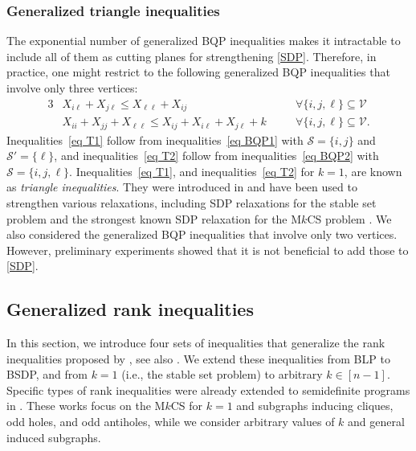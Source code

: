 \documentclass[11pt, a4paper]{article}
\newcommand{\mc}{\mathcal}
\begin{document}
\subsubsection{Generalized triangle inequalities} \label{Sec: Triangle inequalities}
The exponential number of generalized BQP inequalities makes it intractable to include all of them as cutting planes for strengthening \eqref{SDP}.
Therefore, in practice, one might restrict to the following generalized BQP inequalities that involve only three vertices:
\begin{alignat}{3}
    &X_{i\ell} + X_{j\ell} \leq X_{\ell\ell} + X_{ij}  &\quad& \forall \{i,j,\ell\} \subseteq \mc{V} \label{eq T1} \\
    &X_{ii} + X_{jj} + X_{\ell\ell} \leq X_{ij} + X_{i\ell} + X_{j\ell} + k &\quad& \forall \{i,j,\ell\} \subseteq \mc{V}. \label{eq T2}
\end{alignat}
Inequalities~\eqref{eq T1} follow from inequalities~\eqref{eq BQP1} with $\mc{S} = \{i,j\}$ and $\mc{S}' = \{\ell\}$, and inequalities~\eqref{eq T2} follow from inequalities~\eqref{eq BQP2} with $\mc{S} = \{i,j,\ell\}$. 
Inequalities~\eqref{eq T1}, and inequalities~\eqref{eq T2} for $k=1$, are known as \textit{triangle inequalities}. 
They were introduced in \cite{Padberg1989BQP} and have been used to strengthen various relaxations, including SDP relaxations for the stable set problem \citep{Gruber2003SSRelaxations} and the strongest known SDP relaxation for the M$k$CS problem \citep{Kuryatnikova2022MkCSProblem}.
We also considered the generalized BQP inequalities that involve only two vertices. 
However, preliminary experiments showed that it is not beneficial to add those to \eqref{SDP}.

\subsection{Generalized rank inequalities} \label{Sec: Rank inequalities}
In this section, we introduce four sets of inequalities that generalize the rank inequalities proposed by \citet{Nemhauser1974PropertiesPolyhedra}, see also \cite{Letchford2020CliqueAndNodalInequalities}. 
We extend these inequalities from BLP to BSDP, and from $k=1$ (i.e., the stable set problem) to arbitrary $k \in [n-1]$.
Specific types of rank inequalities were already extended to semidefinite programs in \cite{Pucher2023SSAndColoringBounds, Pucher2025PracticalExperience}.  
These works focus on the M$k$CS for $k=1$ and subgraphs inducing cliques, odd holes, and odd antiholes, while we consider arbitrary values of $k$ and general induced subgraphs.
\end{document}
